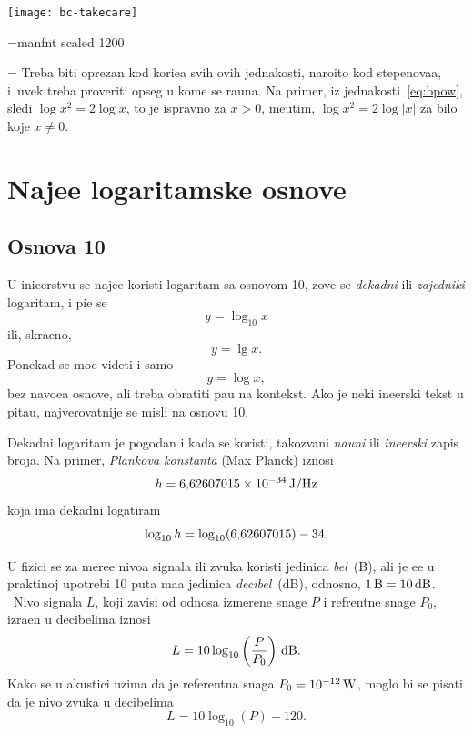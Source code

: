 \documentclass[12pt, twoside, a4paper]{article}
\def\logten{\log_{10}}
\def\puta{\times}
\def\.{\smash{,}\vphantom{.}}
\def\um#1{\,{\rm#1}}
\begin{document}
\bigskip

\newcommand\takecare{\texttt{[image: bc-takecare]}}%
\robustify\takecare

\font\manfnt=manfnt scaled 1200 %
\def\dbend{{\manfnt\char126\relax}}
\def\danger{\hangindent=\parindent 
\hangafter=-2 \noindent\leavevmode
\smash{\hbox to 0pt{\kern-\hangindent\lower1.2pt\hbox{\dbend}\hss}}%
}


\danger\label{danger}%
Treba biti oprezan kod kori{\sv}{\cc}e{\nj}a svih ovih jednakosti, naro{\cv}ito kod ste\-pe\-no\-va{\nj}a, 
i~uvek treba proveriti opseg u kome se ra{\cv}una.
Na primer, iz jed\-na\-ko\-sti~\eqref{eq:bpow}, sledi $\log x^2=2\log x$, {\sv}to je ispravno za $x>0$,
me{\dj}utim, $\log x^2=2\log|x|$ za bilo koje $x\ne0$. 

\section{Naj{\cv}e{\sv}{\cc}e logaritamske osnove}

\subsection{Osnova 10}\index{log10@$\logten$}

U ini{\zv}e{\nj}erstvu se naj{\cv}e{\sv}{\cc}e koristi logaritam sa osnovom 10,
zove se {\sl dekadni\/} ili {\sl zajedni{\cv}ki\/} logaritam, i pi{\sv}e se
$$
y=\logten x
$$
ili, skra{\cc}eno,
$$
y=\lg x.
$$
Ponekad se mo{\zv}e videti i samo
$$
y=\log x,
$$
bez navo{\dj}e{\nj}a osnove, ali treba obratiti pa{\zv}{\nj}u na kontekst.
Ako je neki in{\zv}e{\nj}erski tekst u pita{\nj}u, najverovatnije se misli na osnovu 10.

Dekadni logaritam je pogodan i kada se koristi, takozvani {\sl nau{\cv}ni\/} ili {\sl in{\zv}e{\nj}erski\/}
zapis broja.
Na primer, {\sl Plankova konstanta\/} (Max Planck) iznosi
$$
h=6\.62607015\puta 10^{-34}\um{J/Hz}
$$
koja ima dekadni logatiram
$$
\logten h=\logten(6\.62607015) - 34.
$$

U fizici se za mere{\nj}e nivoa signala ili zvuka koristi jedinica {\sl be\/l}~(B), ali je {\cv}e{\sv}{\cc}e
u prakti{\cv}noj upotrebi 10 puta ma{\nj}a jedinica {\sl decibel\/}~(dB), odnosno, $1\um{B}=10\um{dB}$. \
Nivo \hbox{sig\-na\-la} $L$, koji zavisi
od odnosa izmerene snage $P$ i refrentne snage $P_0$, izra{\zv}en u deci\-belima iznosi
$$
L=10\logten\left(\frac{P}{P_0}\right)\um{dB}.
$$
Kako se u akustici uzima da je referentna snaga $P_0=10^{-12}\um W$, moglo bi se pisati
da je nivo zvuka u decibelima
$$
L=10\logten(P)-120.
$$
\end{document}

